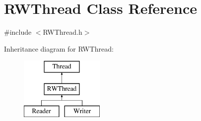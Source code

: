 \hypertarget{class_r_w_thread}{}\section{R\+W\+Thread Class Reference}
\label{class_r_w_thread}


{\ttfamily \#include $<$R\+W\+Thread.\+h$>$}

Inheritance diagram for R\+W\+Thread\+:\begin{figure}[H]
\begin{center}
\leavevmode
\includegraphics[height=3.000000cm]{class_r_w_thread}
\end{center}
\end{figure}
